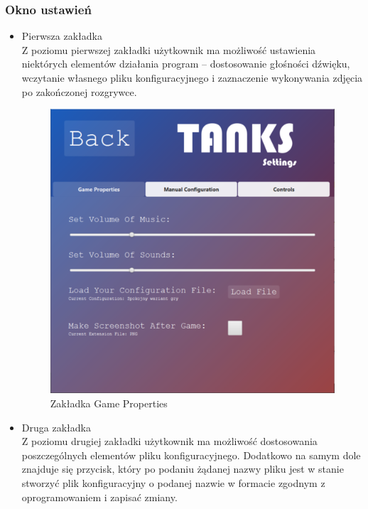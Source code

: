 \documentclass[11pt,a4paper]{report}
\begin{document}
\subsubsection{Okno ustawień}
\begin{itemize}
\item{Pierwsza zakładka}\\
Z poziomu pierwszej zakładki użytkownik ma możliwość ustawienia niektórych elementów działania program --  dostosowanie głośności dźwięku, wczytanie własnego pliku konfiguracyjnego i zaznaczenie wykonywania zdjęcia po zakończonej rozgrywce. 
\begin{figure}[!ht]
\centerline{\includegraphics{img/zakladka1.png}}
\caption{Zakładka Game Properties }
\end{figure}
\newpage
\item{Druga zakładka}\\
Z poziomu drugiej zakładki użytkownik ma możliwość dostosowania poszczególnych elementów pliku konfiguracyjnego. Dodatkowo na samym dole znajduje się przycisk, który po podaniu żądanej nazwy pliku jest w stanie stworzyć plik konfiguracyjny o podanej nazwie w formacie zgodnym z oprogramowaniem i zapisać zmiany.
\begin{figure}[!ht]

\end{figure}
\end{itemize}
\end{document}
